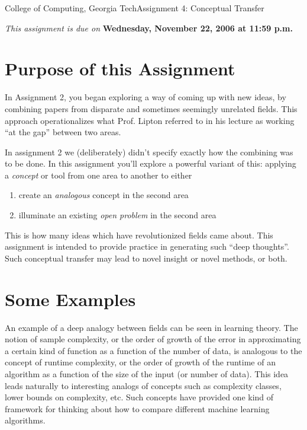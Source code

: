 \documentclass[11pt]{article}
\begin{document}


{College of Computing, Georgia Tech}{Assignment 4: Conceptual Transfer}

{\em This assignment is due on} {\bf Wednesday, November 22, 2006 at 11:59
  p.m.}  


\section{Purpose of this Assignment}

In Assignment 2, you began exploring a 
way of coming up with new ideas, by
combining papers from disparate and sometimes seemingly unrelated
fields.  This approach operationalizes what Prof. Lipton referred to in
his lecture as working ``at the gap'' between two areas.

In assignment 2 we (deliberately) didn't specify exactly how the
combining was to be done.  In this assignment you'll explore a
powerful variant of this: applying a {\em concept} or tool from one
area to another to either
\begin{enumerate}
\itemsep=-1pt
\item create an {\it analogous} concept in the second area
\item illuminate an existing {\it open problem} in the second area
\end{enumerate}
This is how many ideas which have revolutionized fields came about.
This assignment is intended to provide practice in generating such
``deep thoughts''.  Such conceptual transfer may lead to novel insight
or novel methods, or both.

\section{Some Examples}
An example of a deep analogy between fields
can be seen in learning theory.  The notion of sample complexity, or
the order of growth of the error in approximating a certain kind of
function as a function of the number of data, is analogous to the
concept of runtime complexity, or the order of growth of the runtime
of an algorithm as a function of the size of the input (or number of
data).  This idea leads naturally to interesting analogs of 
concepts such as complexity classes, lower bounds on complexity, etc.
Such concepts have provided one kind of framework for thinking about
how to compare different machine learning algorithms.
\end{document}
